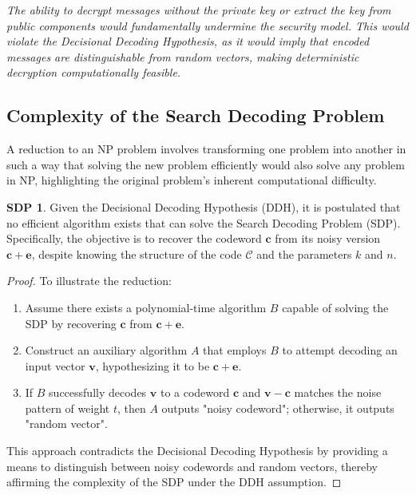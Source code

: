 \textit{The ability to decrypt messages without the private key or extract the key from public components would fundamentally undermine the security model. This would violate the Decisional Decoding Hypothesis, as it would imply that encoded messages are distinguishable from random vectors, making deterministic decryption computationally feasible.}

\subsection{Complexity of the Search Decoding Problem}
A reduction to an NP problem involves transforming one problem into another in such a way that solving the new problem efficiently would also solve any problem in NP, highlighting the original problem's inherent computational difficulty.

\theoremstyle{definition}
\newtheorem*{sdp}{SDP}
\begin{sdp}
Given the Decisional Decoding Hypothesis (DDH), it is postulated that no efficient algorithm exists that can solve the Search Decoding Problem (SDP). Specifically, the objective is to recover the codeword $ \mathbf{c} $ from its noisy version $ \mathbf{c}+\mathbf{e} $, despite knowing the structure of the code $ \mathcal{C} $ and the parameters $ k $ and $ n $.
\end{sdp}

\begin{proof}
To illustrate the reduction:
\begin{enumerate}
    \item Assume there exists a polynomial-time algorithm $ B $ capable of solving the SDP by recovering $ \mathbf{c} $ from $ \mathbf{c} + \mathbf{e} $.
    \item Construct an auxiliary algorithm $ A $ that employs $ B $ to attempt decoding an input vector $ \mathbf{v} $, hypothesizing it to be $ \mathbf{c} + \mathbf{e} $.
    \item If $ B $ successfully decodes $ \mathbf{v} $ to a codeword $ \mathbf{c} $ and $ \mathbf{v} - \mathbf{c} $ matches the noise pattern of weight $ t $, then $ A $ outputs "noisy codeword"; otherwise, it outputs "random vector".
\end{enumerate}
This approach contradicts the Decisional Decoding Hypothesis by providing a means to distinguish between noisy codewords and random vectors, thereby affirming the complexity of the SDP under the DDH assumption.
\end{proof}

